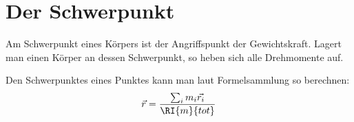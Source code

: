 \section*{Der Schwerpunkt}

Am Schwerpunkt eines Körpers ist der Angriffspunkt der Gewichtskraft.
Lagert man einen Körper an dessen Schwerpunkt, so heben sich alle Drehmomente auf.

Den Schwerpunktes eines Punktes kann man laut Formelsammlung so berechnen:
\begin{eqnarray*}
	\vec{r}=\frac{\sum_i m_i\vec{r_i}}{\RI{m}{tot}}
\end{eqnarray*}


\newpage



